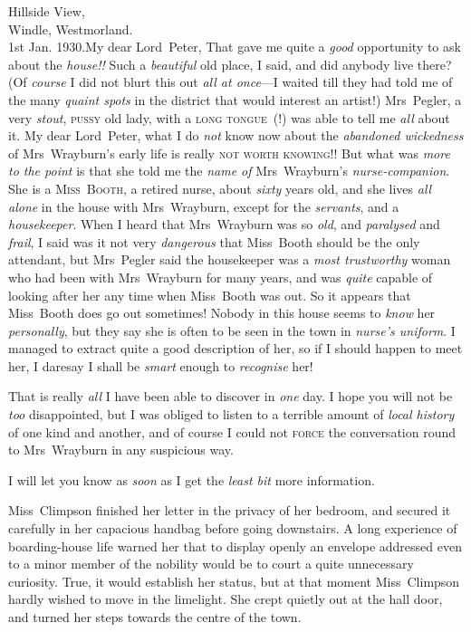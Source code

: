 \begin{mail}{Hillside View,\\Windle, Westmorland.\\1st Jan. 1930.}{My dear Lord~Peter,}
That gave me quite a \emph{good} opportunity to ask about the \emph{house!!} Such a \emph{beautiful} old place, I said, and did anybody live there? (Of \emph{course} I did not blurt this out \emph{all at once}—I waited till they had told me of the many \emph{quaint spots} in the district that would interest an artist!) Mrs~Pegler, a very \emph{stout}, \textsc{pussy} old lady, with a \textsc{long tongue}~(!) was able to tell me \emph{all} about it. My dear Lord~Peter, what I do \emph{not} know now about the \emph{abandoned wickedness} of Mrs~Wrayburn's early life is really \textsc{not worth knowing!!} But what was \emph{more to the point} is that she told me the \emph{name of} Mrs~Wrayburn's \emph{nurse-companion}. She is a \textsc{Miss~Booth}, a retired nurse, about \emph{sixty} years old, and she lives \emph{all alone} in the house with Mrs~Wrayburn, except for the \emph{servants}, and a \emph{housekeeper}. When I heard that Mrs~Wrayburn was so \emph{old}, and \emph{paralysed} and \emph{frail}, I said was it not very \emph{dangerous} that Miss~Booth should be the only attendant, but Mrs~Pegler said the housekeeper was a \emph{most trustworthy} woman who had been with Mrs~Wrayburn for many years, and was \emph{quite} capable of looking after her any time when Miss~Booth was out. So it appears that Miss~Booth does go out sometimes! Nobody in this house seems to \emph{know} her \emph{personally}, but they say she is often to be seen in the town in \emph{nurse's uniform}. I managed to extract quite a good description of her, so if I should happen to meet her, I daresay I shall be \emph{smart} enough to \emph{recognise} her!

That is really \emph{all} I have been able to discover in \emph{one} day. I hope you will not be \emph{too} disappointed, but I was obliged to listen to a terrible amount of \emph{local history} of one kind and another, and of course I could not \textsc{force} the conversation round to Mrs~Wrayburn in any suspicious way.

I will let you know as \emph{soon} as I get the \emph{least bit} more information.

\end{mail}

Miss~Climpson finished her letter in the privacy of her bedroom, and secured it carefully in her capacious handbag before going downstairs. A long experience of boarding-house life warned her that to display openly an envelope addressed even to a minor member of the nobility would be to court a quite unnecessary curiosity. True, it would establish her status, but at that moment Miss~Climpson hardly wished to move in the limelight. She crept quietly out at the hall door, and turned her steps towards the centre of the town.

